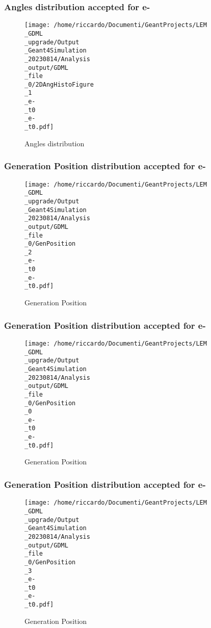 \documentclass[8pt]{beamer}
\begin{document}
            \begin{frame}
                \frametitle{Angles distribution accepted for e-}
            
        \begin{figure}[h]
            \centering
            \texttt{[image: /home/riccardo/Documenti/GeantProjects/LEM\\\_GDML\\\_upgrade/Output\\\_Geant4Simulation\\\_20230814/Analysis\\\_output/GDML\\\_file\\\_0/2DAngHistoFigure\\\_1\\\_e-\\\_t0\\\_e-\\\_t0.pdf]}
            \caption{Angles distribution}
        \end{figure}
        
            \end{frame}
            
            \begin{frame}
                \frametitle{Generation Position distribution accepted for e-}
            
        \begin{figure}[h]
            \centering
            \texttt{[image: /home/riccardo/Documenti/GeantProjects/LEM\\\_GDML\\\_upgrade/Output\\\_Geant4Simulation\\\_20230814/Analysis\\\_output/GDML\\\_file\\\_0/GenPosition\\\_2\\\_e-\\\_t0\\\_e-\\\_t0.pdf]}
            \caption{Generation Position}
        \end{figure}
        
            \end{frame}
            
            \begin{frame}
                \frametitle{Generation Position distribution accepted for e-}
            
        \begin{figure}[h]
            \centering
            \texttt{[image: /home/riccardo/Documenti/GeantProjects/LEM\\\_GDML\\\_upgrade/Output\\\_Geant4Simulation\\\_20230814/Analysis\\\_output/GDML\\\_file\\\_0/GenPosition\\\_0\\\_e-\\\_t0\\\_e-\\\_t0.pdf]}
            \caption{Generation Position}
        \end{figure}
        
            \end{frame}
            
            \begin{frame}
                \frametitle{Generation Position distribution accepted for e-}
            
        \begin{figure}[h]
            \centering
            \texttt{[image: /home/riccardo/Documenti/GeantProjects/LEM\\\_GDML\\\_upgrade/Output\\\_Geant4Simulation\\\_20230814/Analysis\\\_output/GDML\\\_file\\\_0/GenPosition\\\_3\\\_e-\\\_t0\\\_e-\\\_t0.pdf]}
            \caption{Generation Position}
        \end{figure}
        
            \end{frame}
            
\end{document}
